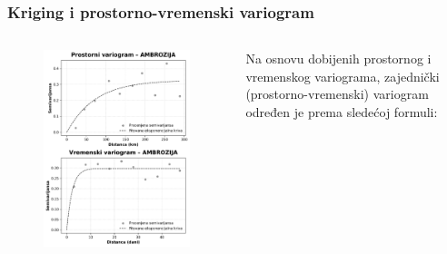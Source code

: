 \begin{frame}
    \frametitle{Kriging i prostorno-vremenski variogram}

    \begin{columns}[T, totalwidth=\textwidth]

        \begin{column}{0.55\textwidth}
            \begin{figure}
                \centering
            \includegraphics[height=0.9\textheight]{images/AMBROZIJA_variogrami.png}
            \end{figure}
        \end{column}

        \begin{column}{0.43\textwidth}
            Na osnovu dobijenih prostornog i vremenskog variograma, zajednički (prostorno-vremenski)
            variogram određen je prema sledećoj formuli:


\end{column}
\end{columns}
\end{frame}
